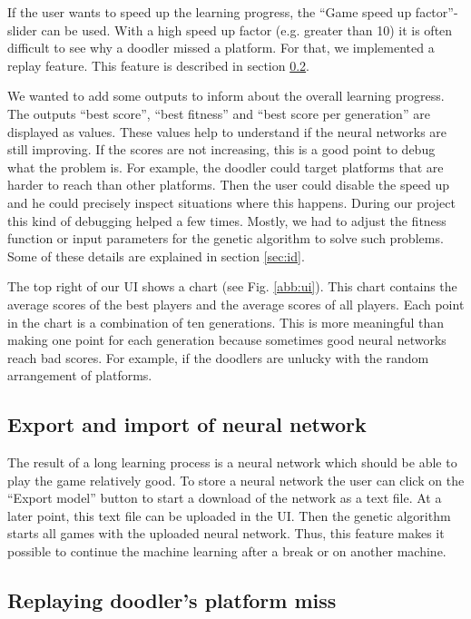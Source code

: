 \documentclass[a4paper,12pt,pagesize,headsepline,bibtotoc,titlepage,abstracton]{scrartcl}
\begin{document}
If the user wants to speed up the learning progress, the ``Game speed up factor''-slider can be used. With a high speed up factor (e.g. greater than 10) it is often difficult to see why a doodler missed a platform. For that, we implemented a replay feature. This feature is described in section \ref{sec:rdpm}.

We wanted to add some outputs to inform about the overall learning progress. The outputs ``best score'', ``best fitness'' and ``best score per generation'' are displayed as values. These values help to understand if the neural networks are still improving. If the scores are not increasing, this is a good point to debug what the problem is. For example, the doodler could target platforms that are harder to reach than other platforms. Then the user could disable the speed up and he could precisely inspect situations where this happens. During our project this kind of debugging helped a few times. Mostly, we had to adjust the fitness function or input parameters for the genetic algorithm to solve such problems. Some of these details are explained in section \ref{sec:id}.

The top right of our UI shows a chart (see Fig. \ref{abb:ui}). This chart contains the average scores of the best players and the average scores of all players. Each point in the chart is a combination of ten generations. This is more meaningful than making one point for each generation because sometimes good neural networks reach bad scores. For example, if the doodlers are unlucky with the random arrangement of platforms.

\subsection{Export and import of neural network}

The result of a long learning process is a neural network which should be able to play the game relatively good. To store a neural network the user can click on the ``Export model'' button to start a download of the network as a text file. At a later point, this text file can be uploaded in the UI. Then the genetic algorithm starts all games with the uploaded neural network. Thus, this feature makes it possible to continue the machine learning after a break or on another machine.

\subsection{Replaying doodler's platform miss}
\label{sec:rdpm}
\end{document}
